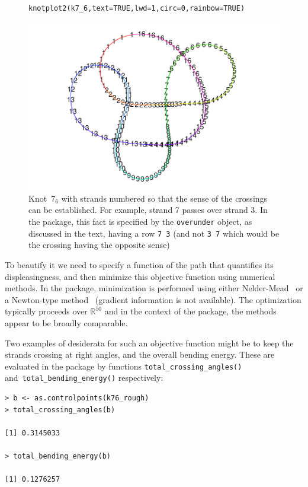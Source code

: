 \documentclass{birkjour}
\theoremstyle{definition}
\theoremstyle{remark}
\numberwithin{equation}{section}
\begin{document}
\begin{figure}[!tbp]
\begin{verbatim}
knotplot2(k7_6,text=TRUE,lwd=1,circ=0,rainbow=TRUE)
\end{verbatim}
 \centering
\includegraphics[scale = 0.9]{knot-004}
\caption{Knot~$7_6$ with strands numbered \label{k76_strands} so that
  the sense of the crossings can be established.  For example, strand
  7 passes over strand 3.  In the package, this fact is specified by
  the {\tt overunder} object, as discussed in the text, having a row
  {\tt 7 3} (and not {\tt 3 7} which would be the crossing having the
  opposite sense)} \end{figure}

To beautify it we need to specify a function of the path that
quantifies its displeasingness, and then minimize this objective
function using numerical methods.  In the package, minimization is
performed using either Nelder-Mead~\cite{nelder1965} or a Newton-type
method~\cite{dennis1983} (gradient information is not available).  The
optimization typically proceeds over $\mathbb{R}^{50}$ and in the
context of the package, the methods appear to be broadly comparable.

Two examples of desiderata for such an objective function might be to
keep the strands crossing at right angles, and the overall bending
energy.  These are evaluated in the package by functions
{\tt total\_crossing\_angles()} and~{\tt total\_bending\_energy()}
respectively:

\begin{verbatim}
> b <- as.controlpoints(k76_rough)
> total_crossing_angles(b)

[1] 0.3145033

> total_bending_energy(b)

[1] 0.1276257
\end{verbatim}
\end{document}
